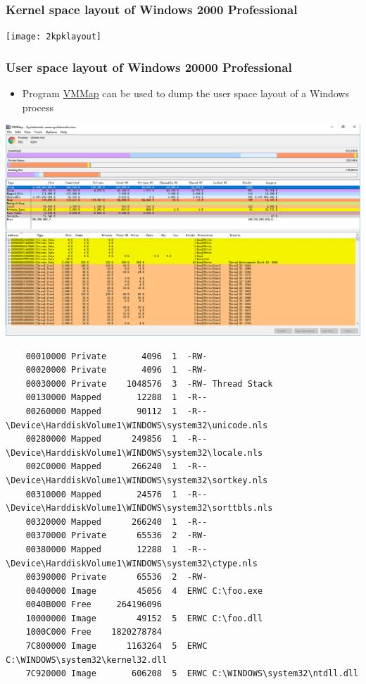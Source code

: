 \documentclass[CJKutf8,dvipsnames,table]{beamer}
\begin{document}
\begin{CJK*}{UTF8}{song}
  \begin{frame}
    \frametitle{Kernel space layout of Windows 2000 Professional} \pause
    \begin{center}
      \texttt{[image: 2kpklayout]}
    \end{center}
  \end{frame}

  \begin{frame}[fragile]
    \frametitle{User space layout of Windows 20000 Professional} \pause
    \begin{itemize}\parskip=0pt
    \item{Program \href{https://docs.microsoft.com/en-us/sysinternals/downloads/vmmap}{VMMap} can be used to dump the user space layout of a Windows process} \pause
    \end{itemize}
    \begin{center}
		\includegraphics[scale=0.3]{vmmap}
	\end{center}

\iffalse

    {\tiny
\begin{verbatim}
    00010000 Private       4096  1  -RW-
    00020000 Private       4096  1  -RW-
    00030000 Private    1048576  3  -RW- Thread Stack
    00130000 Mapped       12288  1  -R--
    00260000 Mapped       90112  1  -R-- \Device\HarddiskVolume1\WINDOWS\system32\unicode.nls
    00280000 Mapped      249856  1  -R-- \Device\HarddiskVolume1\WINDOWS\system32\locale.nls
    002C0000 Mapped      266240  1  -R-- \Device\HarddiskVolume1\WINDOWS\system32\sortkey.nls
    00310000 Mapped       24576  1  -R-- \Device\HarddiskVolume1\WINDOWS\system32\sorttbls.nls
    00320000 Mapped      266240  1  -R--
    00370000 Private      65536  2  -RW-
    00380000 Mapped       12288  1  -R-- \Device\HarddiskVolume1\WINDOWS\system32\ctype.nls
    00390000 Private      65536  2  -RW-
    00400000 Image        45056  4  ERWC C:\foo.exe
    0040B000 Free     264196096
    10000000 Image        49152  5  ERWC C:\foo.dll
    1000C000 Free    1820278784
    7C800000 Image      1163264  5  ERWC C:\WINDOWS\system32\kernel32.dll
    7C920000 Image       606208  5  ERWC C:\WINDOWS\system32\ntdll.dll
\end{verbatim}
    }


\end{frame}
\end{CJK*}
\end{document}
